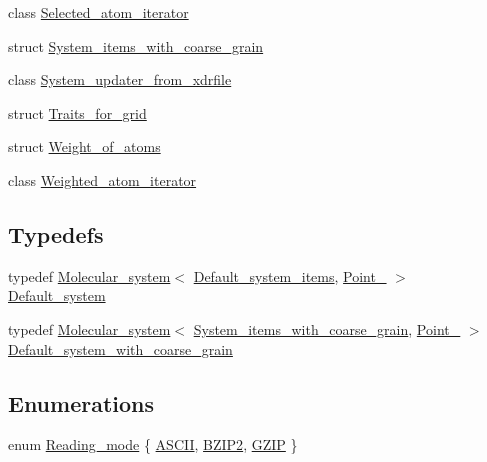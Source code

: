 \begin{DoxyCompactItemize}
class \hyperlink{classESBTL_1_1Selected__atom__iterator}{Selected\+\_\+atom\+\_\+iterator}
\item 
struct \hyperlink{structESBTL_1_1System__items__with__coarse__grain}{System\+\_\+items\+\_\+with\+\_\+coarse\+\_\+grain}
\item 
class \hyperlink{classESBTL_1_1System__updater__from__xdrfile}{System\+\_\+updater\+\_\+from\+\_\+xdrfile}
\item 
struct \hyperlink{structESBTL_1_1Traits__for__grid}{Traits\+\_\+for\+\_\+grid}
\item 
struct \hyperlink{structESBTL_1_1Weight__of__atoms}{Weight\+\_\+of\+\_\+atoms}
\item 
class \hyperlink{classESBTL_1_1Weighted__atom__iterator}{Weighted\+\_\+atom\+\_\+iterator}
\end{DoxyCompactItemize}
\subsection*{Typedefs}
\begin{DoxyCompactItemize}
\item 
typedef \hyperlink{classESBTL_1_1Molecular__system}{Molecular\+\_\+system}$<$ \hyperlink{structESBTL_1_1Default__system__items}{Default\+\_\+system\+\_\+items}, \hyperlink{classESBTL_1_1Point__3}{Point\+\_} $>$ \hyperlink{namespaceESBTL_a80ccb2de0f963d73a45f0bce33397cd2}{Default\+\_\+system}
\item 
typedef \hyperlink{classESBTL_1_1Molecular__system}{Molecular\+\_\+system}$<$ \hyperlink{structESBTL_1_1System__items__with__coarse__grain}{System\+\_\+items\+\_\+with\+\_\+coarse\+\_\+grain}, \hyperlink{classESBTL_1_1Point__3}{Point\+\_} $>$ \hyperlink{namespaceESBTL_a6050f8db412cd612ac31dcb54e355dfd}{Default\+\_\+system\+\_\+with\+\_\+coarse\+\_\+grain}
\end{DoxyCompactItemize}
\subsection*{Enumerations}
\begin{DoxyCompactItemize}
\item 
enum \hyperlink{namespaceESBTL_a46426c3ec10681a36a08e798f8f0f72a}{Reading\+\_\+mode} \{ \hyperlink{namespaceESBTL_a46426c3ec10681a36a08e798f8f0f72aaa646ddddd8ed4bb5808e2f6a8cb239d9}{A\+S\+C\+II}, 
\hyperlink{namespaceESBTL_a46426c3ec10681a36a08e798f8f0f72aa2cf153bcb23f031f23d9a90cab0f349c}{B\+Z\+I\+P2}, 
\hyperlink{namespaceESBTL_a46426c3ec10681a36a08e798f8f0f72aa38db8819e1a2b01bdd679ed87d8e5e1f}{G\+Z\+IP}
 \}
\end{DoxyCompactItemize}
